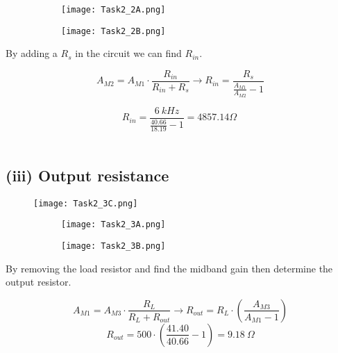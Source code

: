	\begin{figure}[h]
        \centering
        \begin{subfigure}[h]{0.5\textwidth}
                \texttt{[image: Task2\_2A.png]}
                \label{fig:}
        \end{subfigure}
        \begin{subfigure}[h]{0.2\textwidth}
                \texttt{[image: Task2\_2B.png]}
                \label{fig:}
        \end{subfigure}
	\end{figure}

	By adding a $R_{s}$ in the circuit we can find $R_{in}$.

	$$ A_{M2} = A_{M1} \cdot \frac{R_{in}}{R_{in} + R_{s}} \rightarrow R_{in} = \frac{R_{s}}{\frac{A_{M1}}{A_{M2}}-1} $$
	
	$$R_{in} = \frac{6\ kHz}{\frac{40.66}{18.19}-1} = 4857.14 \Omega \ $$ \\

 	\subsection*{(iii) Output resistance}

	\begin{figure}[h!]
	    \centering
	    \texttt{[image: Task2\_3C.png]}
	\end{figure}  

	\begin{figure}[h!]
	    \centering
	    \begin{subfigure}[h]{0.5\textwidth}
	            \texttt{[image: Task2\_3A.png]}
	            \label{fig:}
	    \end{subfigure}
	    \begin{subfigure}[h]{0.2\textwidth}
	            \texttt{[image: Task2\_3B.png]}
	            \label{fig:}
	    \end{subfigure}
	\end{figure}

	By removing the load resistor and find the midband gain then determine the output resistor.

	$$A_{M1} = A_{M3} \cdot \frac{R_{L}}{R_{L} + R_{out}} \rightarrow R_{out} = R_{L} \cdot (\frac{A_{M3}}{A_{M1} - 1})  $$
	$$R_{out} = 500 \cdot (\frac{41.40}{40.66}-1) = 9.18\ \Omega$$ \\


